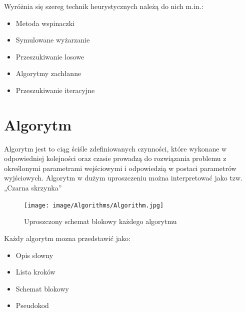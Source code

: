 \documentclass[eng, pl, oneside, openright, final, openbib]{mgr}\DeclareUnicodeCharacter{0301}{\'{e}}
\begin{document}

Wyróżnia się szereg technik heurystycznych należą do nich m.in.:
\begin{itemize}
\item Metoda wspinaczki
\item Symulowane wyżarzanie
\item Przeszukiwanie losowe
\item Algorytmy zachłanne
\item Przeszukiwanie iteracyjne
\end{itemize}
\chapter{Algorytm}
Algorytm jest to ciąg ściśle zdefiniowanych czynności, które wykonane w odpowiedniej kolejności oraz czasie prowadzą do rozwiązania problemu z określonymi parametrami wejściowymi i odpowiedzią w postaci parametrów wyjściowych. Algorytm w dużym uproszczeniu można interpretować jako tzw. „Czarna skrzynka”
\begin{figure}[h]
\centering
\texttt{[image: image/Algorithms/Algorithm.jpg]}
\caption{Uproszczony schemat blokowy każdego algorytmu}
\end{figure}

Każdy algorytm mozna przedstawić jako: 
\begin{itemize}
 \item Opis słowny
 \item Lista kroków
 \item Schemat blokowy
 \item Pseudokod
 
\end{itemize}
\end{document}
